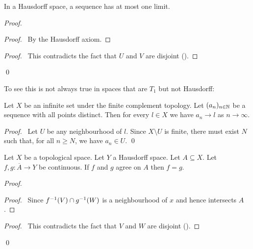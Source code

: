 \begin{theorem}
    In a Hausdorff space, a sequence has at most one limit.
\end{theorem}

\begin{proof}
    \pf
    \begin{proof}
        \pf\ By the Hausdorff axiom.
    \end{proof}
    \qedstep
    \begin{proof}
        \pf\ This contradicts the fact that $U$ and $V$ are disjoint ().
    \end{proof}
    \qed
\end{proof}

To see this is not always true in spaces that are $T_1$ but not Hausdorff:

\begin{proposition}
    Let $X$ be an infinite set under the finite complement topology. Let $(a_n)_{n \in \mathbb{N}}$ be a sequence
    with all points distinct. Then for every $l \in X$ we have $a_n \rightarrow l$ as
    $n \rightarrow \infty$.
\end{proposition}

\begin{proof}
    \pf\ Let $U$ be any neighbourhood of $l$. Since $X \setminus U$ is finite, there must exist $N$
    such that, for all $n \geq N$, we have $a_n \in U$. \qed
\end{proof}

\begin{proposition}
    Let $X$ be a topological space. Let $Y$ a Hausdorff space. Let $A \subseteq X$. Let $f, g : \overline{A} \rightarrow Y$ be continuous.
    If $f$ and $g$ agree on $A$ then $f = g$.
\end{proposition}

\begin{proof}
    \pf
    \begin{proof}
        \pf\ Since ${f}^{-1}(V) \cap {g}^{-1}(W)$ is a neighbourhood of $x$ and hence intersects $A$.
    \end{proof}
    \qedstep
    \begin{proof}
        \pf\ This contradicts the fact that $V$ and $W$ are disjoint ().
    \end{proof}
    \qed
\end{proof}

